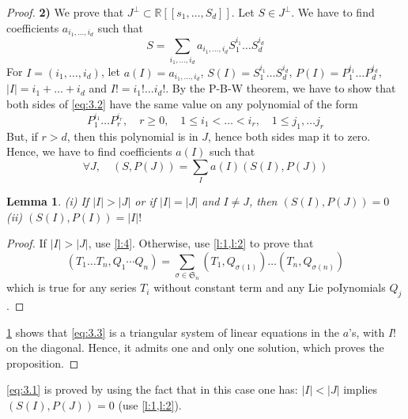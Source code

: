 \documentclass[a4paper,12pt]{article}
\newtheorem{lemma}{Lemma}
\newcommand{\R}{\mathbb{R}}
\begin{document}
\begin{proof}
	\textbf{2)} We prove that $J^{\perp} \subset \R\left[\left[s_1, \ldots, S_d\right]\right]$. Let $S \in J^{\perp}$. We have to find coefficients $a_{i_1, \ldots, i_d}$ such that
	\begin{equation*} \label{eq:3.2} \tag{2}
		S=\sum_{i_1, \ldots, i_d} a_{i_1, \ldots, i_d} S_1^{i_1} \ldots S_d^{i_d}
	\end{equation*}
	For $I=\left(i_1, \ldots, i_d\right)$, let $a(I)=a_{i_1, \ldots, i_d}$, $S(I)=S_1^{i_1} \ldots S_d^{i_d}$, $P(I)={P}_1^{i_1} \ldots {P}_{{d}}^{i_{{d}}}$, $|I|=i_1+\ldots+i_{{d}}$ and $I !=i_{1} ! \ldots i_d!$. By the P-B-W theorem, we have to show that both sides of \eqref{eq:3.2} have the same value on any polynomial of the form
	\begin{equation*}
		{P}_1^{i_1} \ldots {P}_{{r}}^{{i}_{{r}}}, \quad {r} \geq 0, \quad 1 \leq {i}_1<\ldots<{i}_{{r}}, \quad 1 \leq j_1, \ldots j_{{r}}
	\end{equation*}
	But, if ${r}>{d}$, then this polynomial is in ${J}$, hence both sides map it to zero. Hence, we have to find coefficients $a(I)$ such that
	\begin{equation} \label{eq:3.3} \tag{3}
		\forall {J}, \quad ({S}, {P}({J}))=\sum_{{I}} {a}({I})({S}({I}), {P}({J}))
	\end{equation}

	\begin{lemma} \label{l:5}
		(i) If $|I|>|J|$ or if $|I|=|J|$ and $I \neq J$, then $(S(I), P(J))=0$ \\
		(ii) $(S(I),P(I))=|I|!$
	\end{lemma}
	
	\begin{proof}
		If $|I|>|J|$, use \cref{l:4}. Otherwise, use \cref{l:1,l:2} to prove that
		\begin{equation*}
			\left(T_1 \ldots T_n, Q_1 \cdots Q_n\right)=\sum_{\sigma \in \mathfrak{S}_n}\left(T_1, Q_{\sigma(1)}\right) \ldots\left(T_n, Q_{\sigma(n)}\right)
		\end{equation*}
		which is true for any series ${T}_i$ without constant term and any Lie poIynomials ${Q}_j$.
	\end{proof}

	\cref{l:5} shows that \eqref{eq:3.3} is a triangular system of linear equations in the $a$'s, with $I!$ on the diagonal. Hence, it admits one and only one solution, which proves the proposition.
\end{proof}

\eqref{eq:3.1} is proved by using the fact that in this case one has: $|I|<|J|$ implies $(S(I), P(J))=0$ (use \cref{l:1,l:2}).
\end{document}
